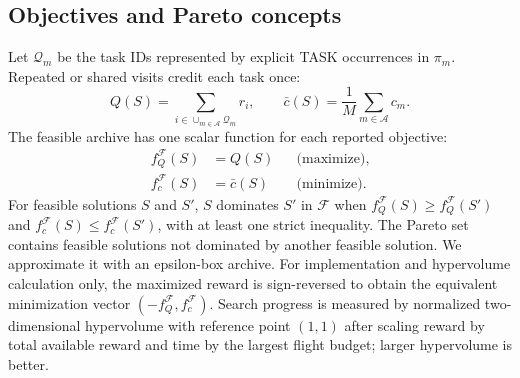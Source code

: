 \subsection{Objectives and Pareto concepts}
Let $\mathcal Q_m$ be the task IDs represented by explicit TASK occurrences in $\pi_m$. Repeated or shared visits credit each task once:
\begin{equation}
 Q(S)=\sum_{i\in\cup_{m\in\mathcal A}\mathcal Q_m}r_i,
 \qquad \bar c(S)=\frac{1}{M}\sum_{m\in\mathcal A}c_m.
 \label{eq:reward}
\end{equation}
The feasible archive has one scalar function for each reported objective:
\begin{align}
 f_Q^{\mathcal F}(S)&=Q(S) &&\text{(maximize)},\nonumber\\
 f_c^{\mathcal F}(S)&=\bar c(S) &&\text{(minimize)}.
 \label{eq:objectives}
\end{align}
For feasible solutions $S$ and $S'$, $S$ dominates $S'$ in $\mathcal F$ when $f_Q^{\mathcal F}(S)\ge f_Q^{\mathcal F}(S')$ and $f_c^{\mathcal F}(S)\le f_c^{\mathcal F}(S')$, with at least one strict inequality. The Pareto set contains feasible solutions not dominated by another feasible solution. We approximate it with an epsilon-box archive. For implementation and hypervolume calculation only, the maximized reward is sign-reversed to obtain the equivalent minimization vector $(-f_Q^{\mathcal F},f_c^{\mathcal F})$. Search progress is measured by normalized two-dimensional hypervolume with reference point $(1,1)$ after scaling reward by total available reward and time by the largest flight budget; larger hypervolume is better.

